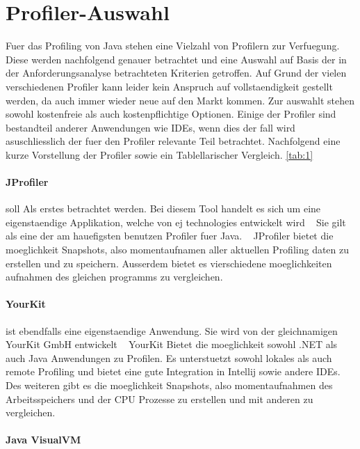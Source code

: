 \documentclass{article}
\begin{document}
\section{Profiler-Auswahl}

Fuer das Profiling von Java stehen eine Vielzahl von Profilern zur Verfuegung. ~\cite{Website:1} Diese werden nachfolgend genauer betrachtet und eine Auswahl auf Basis der in der Anforderungsanalyse betrachteten Kriterien getroffen.
Auf Grund der vielen verschiedenen Profiler kann leider kein Anspruch auf vollstaendigkeit gestellt werden, da auch immer wieder neue auf den Markt kommen. Zur auswahlt stehen sowohl kostenfreie  als auch kostenpflichtige Optionen. Einige der Profiler sind bestandteil anderer Anwendungen wie IDEs, wenn dies der fall wird asuschliesslich der fuer den Profiler relevante Teil betrachtet. Nachfolgend eine kurze Vorstellung der Profiler sowie ein Tablellarischer Vergleich. \ref{tab:1}

\paragraph{JProfiler}

  soll Als erstes betrachtet werden. Bei diesem Tool handelt es sich um eine eigenstaendige Applikation, welche von ej technologies entwickelt wird ~\cite{WEBSITE:2} Sie gilt als eine der am hauefigsten benutzen Profiler fuer Java. ~\cite{WEBSITE:3} JProfiler bietet die moeglichkeit Snapshots, also momentaufnamen aller aktuellen Profiling daten zu erstellen und zu speichern. Ausserdem bietet es vierschiedene moeglichkeiten aufnahmen des gleichen programms zu vergleichen.

\paragraph{YourKit}
 ist ebendfalls eine eigenstaendige Anwendung. Sie wird von der gleichnamigen YourKit GmbH entwickelt ~\cite{WEBSITE:4} YourKit Bietet die moeglichkeit sowohl .NET als auch Java Anwendungen zu Profilen. Es unterstuetzt sowohl lokales als auch remote Profiling und bietet eine gute Integration in Intellij sowie andere IDEs. Des weiteren gibt es die moeglichkeit Snapshots, also momentaufnahmen des Arbeitsspeichers und der CPU Prozesse zu erstellen und mit anderen zu vergleichen.

\paragraph{Java VisualVM}
\end{document}
